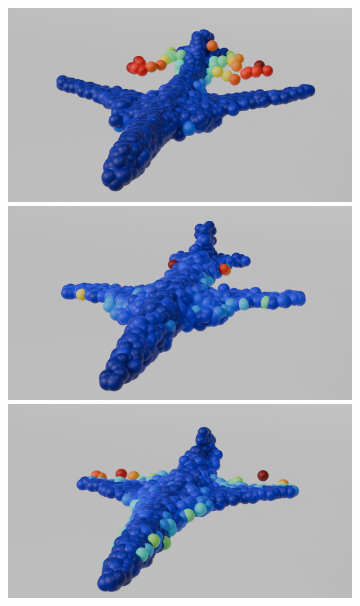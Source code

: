 \begin{figure}[htb]
\begin{subfigure}[t]{\textwidth+20pt\relax}
            \includegraphics[width=\dimexpr\linewidth-20pt\relax]{figures/10z_ap_mcdc.png}
            \includegraphics[width=\dimexpr\linewidth-20pt\relax]{figures/25z_ap_mcdc.png}
            \includegraphics[width=\dimexpr\linewidth-20pt\relax]{figures/50z_ap_mcdc.png}

\end{subfigure}
\end{figure}
